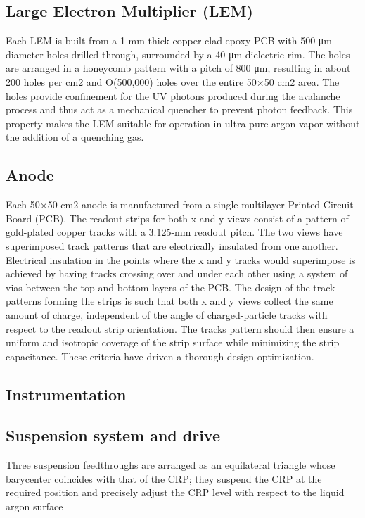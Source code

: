 \subsection{Large Electron Multiplier (LEM)}
\label{sec:fddp-crp-lem}
Each LEM is built from a 1-mm-thick copper-clad epoxy PCB with 500 μm diameter holes drilled through, surrounded by a 40-μm dielectric rim. The holes are arranged in a honeycomb pattern with a pitch of 800 μm, resulting in about 200 holes per cm2
and O(500,000) holes over the entire 50×50 cm2 area. The holes provide confinement for the UV photons produced during the avalanche process and thus act as a mechanical quencher to prevent photon feedback. This property makes the LEM suitable for operation in ultra-pure argon vapor without the addition of a quenching gas.

\subsection{Anode}
\label{sec:fddp-crp-anode}
Each 50×50 cm2 anode is manufactured from a single multilayer Printed Circuit Board (PCB). The readout strips for both x and y views consist of a pattern of gold-plated
copper tracks with a 3.125-mm readout pitch. The two views have superimposed track patterns
that are electrically insulated from one another. Electrical insulation in the points where the x and y tracks would superimpose is achieved by having tracks crossing over and under each other using a system of vias between the top and bottom layers of the PCB.
The design of the track patterns forming the strips is such that both x and y views collect the same amount of charge, independent of the angle of charged-particle tracks with respect to the readout strip orientation. The tracks pattern should then ensure a uniform and isotropic coverage of the strip surface while minimizing the strip capacitance. These criteria have driven a thorough design optimization. 

\subsection{Instrumentation}
\label{sec:fddp-crp-instr}

\subsection{Suspension system and drive}
\label{sec:fddp-crp-suspension}
Three suspension feedthroughs are arranged as an equilateral triangle whose barycenter coincides with that of the CRP; they suspend the CRP at the required position and precisely adjust the CRP level with respect to the liquid argon surface

